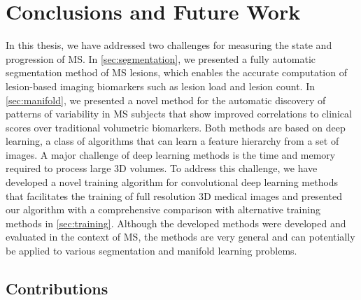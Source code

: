 \chapter{Conclusions and Future Work}

In this thesis, we have addressed two challenges for measuring the state and
progression of MS. In \ref{sec:segmentation}, we presented a fully automatic
segmentation method of MS lesions, which enables the accurate computation of
lesion-based imaging biomarkers such as lesion load and lesion count. In
\ref{sec:manifold}, we presented a novel method for the automatic discovery of
patterns of variability in MS subjects that show improved correlations to
clinical scores over traditional volumetric biomarkers. Both methods are based
on deep learning, a class of algorithms that can learn a feature hierarchy from
a set of images. A major challenge of deep learning methods is the time and
memory required to process large 3D volumes. To address this challenge, we have
developed a novel training algorithm for convolutional deep learning methods
that facilitates the training of full resolution 3D medical images and presented
our algorithm with a comprehensive comparison with alternative training
methods in \ref{sec:training}. Although the developed methods were
developed and evaluated in the context of MS, the methods are very general and
can potentially be applied to various segmentation and manifold learning
problems.

\section{Contributions}

